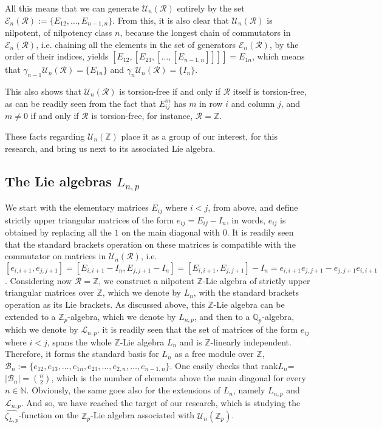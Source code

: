 \documentclass[12pt]{article}
\begin{document}
All this means that we can generate $\mathcal{U}_n(\mathcal{R})$ entirely by the set $\mathcal{E}_n(\mathcal{R}):=\{E_{12},\dots,E_{n-1,n}\}$. From this, it is also clear that $\mathcal{U}_n(\mathcal{R})$ is nilpotent, of nilpotency class $n$, because the longest chain of commutators in $\mathcal{E}_n(\mathcal{R})$, i.e. chaining all the elements in the set of generators $\mathcal{E}_n(\mathcal{R})$, by the order of their indices, yields $[E_{12},[E_{23},[\dots,[E_{n-1,n}]]]]=E_{1n}$, which means that $\gamma_{n-1}\mathcal{U}_n(\mathcal{R})=\{E_{1n}\}$ and $\gamma_n \mathcal{U}_n(\mathcal{R})=\{I_n\}$.\par
This also shows that $\mathcal{U}_n(\mathcal{R})$ is torsion-free if and only if $\mathcal{R}$ itself is torsion-free, as can be readily seen from the fact that $E_{ij}^m$ has $m$ in row $i$ and column $j$, and $m\neq 0$ if and only if $\mathcal{R}$ is torsion-free, for instance, $\mathcal{R}=\mathbb{Z}$.\par
These facts regarding $\mathcal{U}_n(\mathbb{Z})$ place it as a group of our interest, for this research, and bring us next to its associated Lie algebra.
\subsection{The Lie algebras $L_{n,p}$}
We start with the elementary matrices $E_{ij}$ where $i<j$, from above, and define strictly upper triangular matrices of the form $e_{ij}=E_{ij}-I_n$, in words, $e_{ij}$ is obtained by replacing all the $1$ on the main diagonal with $0$. It is readily seen that the standard brackets operation on these matrices is compatible with the commutator on matrices in $\mathcal{U}_n(\mathcal{R})$, i.e. $[e_{i,i+1},e_{j,j+1}]=[E_{i,i+1}-I_n,E_{j,j+1}-I_n]=[E_{i,i+1},E_{j,j+1}]-I_n=e_{i,i+1}e_{j,j+1}-e_{j,j+1}e_{i,i+1}$. Considering now $\mathcal{R}=\mathbb{Z}$, we construct a nilpotent $\mathbb{Z}$-Lie algebra of strictly upper triangular matrices over $\mathbb{Z}$, which we denote by $L_n$, with the standard brackets operation as its Lie brackets. As discussed above, this $\mathbb{Z}$-Lie algebra can be extended to a $\mathbb{Z}_p$-algebra, which we denote by $L_{n,p}$, and then to a $\mathbb{Q}_p$-algebra, which we denote by $\mathcal{L}_{n,p}$.
it is readily seen that the set of matrices of the form $e_{ij}$ where $i<j$, spans the whole $\mathbb{Z}$-Lie algebra $L_n$ and is $\mathbb{Z}$-linearly independent. Therefore, it forms the standard basis for $L_n$ as a free module over $\mathbb{Z}$, $\mathcal{B}_n:=\{e_{12},e_{13},\dots,e_{1n},e_{23},\dots,e_{2,n},\dots,e_{n-1,n}\}$. One easily checks that rank$L_n$=$|\mathcal{B}_n|=\binom{n}{2}$, which is the number of elements above the main diagonal for every $n\in\mathbb{N}$. Obviously, the same goes also for the extensions of $L_n$, namely $L_{n,p}$ and $\mathcal{L}_{n,p}$. And so, we have reached the target of our research, which is studying the $\hat{\zeta_{L,p}}$-function on the $\mathbb{Z}_p$-Lie algebra associated with $\mathcal{U}_n(\mathbb{Z}_p)$.
\end{document}

